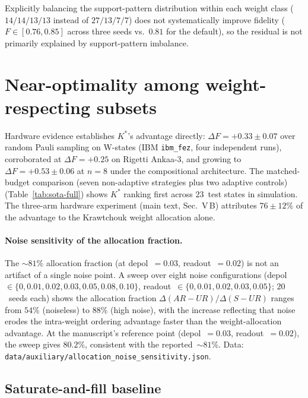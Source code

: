 \documentclass[twocolumn,prx,aps,superscriptaddress,longbibliography]{revtex4-2}
\begin{document}
Explicitly balancing the support-pattern distribution within each
weight class ($14/14/13/13$ instead of $27/13/7/7$) does not
systematically improve fidelity ($F \in [0.76, 0.85]$ across three
seeds vs.\ $0.81$ for the default), so the residual is not primarily
explained by support-pattern imbalance.


\section{Near-optimality among weight-respecting subsets}
\label{sec:optimality-test}

Hardware evidence establishes $K^*$'s advantage directly:
$\Delta F = +0.33 \pm 0.07$ over random Pauli sampling on W-states
(IBM \texttt{ibm\_fez}, four independent runs), corroborated at
$\Delta F = +0.25$ on Rigetti Ankaa-3, and growing to
$\Delta F = +0.53 \pm 0.06$ at $n = 8$ under the compositional
architecture.  The matched-budget comparison (seven non-adaptive
strategies plus two adaptive controls)
(Table~\ref{tab:sota-full}) shows $K^*$ ranking first across
$23$~test states in simulation.
The three-arm hardware experiment (main text, Sec.~V\,B)
attributes $76 \pm 12$\% of the advantage to the Krawtchouk weight
allocation alone.

\paragraph{Noise sensitivity of the allocation fraction.}
The ${\sim}81\%$ allocation fraction (at depol~$= 0.03$,
readout~$= 0.02$) is not an artifact of a single noise point.
A sweep over eight noise configurations
(depol~$\in \{0, 0.01, 0.02, 0.03, 0.05, 0.08, 0.10\}$,
readout~$\in \{0, 0.01, 0.02, 0.03, 0.05\}$; $20$~seeds each)
shows the allocation fraction $\Delta(AR{-}UR)/\Delta(S{-}UR)$
ranges from $54\%$ (noiseless) to $88\%$ (high noise), with
the increase reflecting that noise erodes the intra-weight
ordering advantage faster than the weight-allocation advantage.
At the manuscript's reference point (depol~$= 0.03$,
readout~$= 0.02$), the sweep gives $80.2\%$, consistent with
the reported~${\sim}81\%$.
Data: \texttt{data/auxiliary/allocation\_noise\_sensitivity.json}.

\subsection{Saturate-and-fill baseline}
\label{sec:sat-fill}
\end{document}
